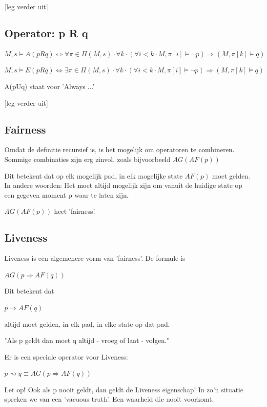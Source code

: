 \documentclass{article}
\begin{document}
		[leg verder uit] 		

		\subsection{Operator: p R q}
				
		\( M, s \models A(pRq) \iff \forall \pi \in \Pi (M, s) \cdot \forall k \cdot (\forall i < k \cdot M, \pi [i] \models \neg p) \Rightarrow (M, \pi [k] \models q) \)

		\( M, s \models E(pRq) \iff \exists \pi \in \Pi (M, s) \cdot \forall k \cdot (\forall i < k \cdot M, \pi [i] \models \neg p) \Rightarrow (M, \pi [k] \models q) \)

		A(pUq) staat voor 'Always ...' 

		[leg verder uit] 		
		
		\subsection{Fairness}
				
		Omdat de definitie recursief is, is het mogelijk om operatoren te combineren. Sommige combinaties zijn erg zinvol, zoals bijvoorbeeld \( AG ( AF (p) )\)

		Dit betekent dat op elk mogelijk pad, in elk mogelijke state \( AF(p) \) moet gelden. In andere woorden: Het moet altijd mogelijk zijn om vanuit de huidige state op een gegeven moment p waar te laten zijn. 

		\( AG ( AF ( p ) ) \) heet 'fairness'.
		
		\subsection{Liveness}
			
		Liveness is een algemenere vorm van 'fairness'. De formule is 

		\( AG (p \Rightarrow AF(q)) \) 

		Dit betekent dat 

		 \( p \Rightarrow AF(q) \) 

		altijd moet gelden, in elk pad, in elke state op dat pad.

		"Als p geldt dan moet q altijd - vroeg of laat - volgen."

		Er is een speciale operator voor Liveness:

		\( p \rightsquigarrow q \equiv AG (p \Rightarrow AF (q) ) \)

		Let op! Ook als p nooit geldt, dan geldt de Liveness eigenschap! In zo'n situatie spreken we van een 'vacuous truth'. Een waarheid die nooit voorkomt.
		
	
	\newpage
	
	
	 
	
\end{document}
